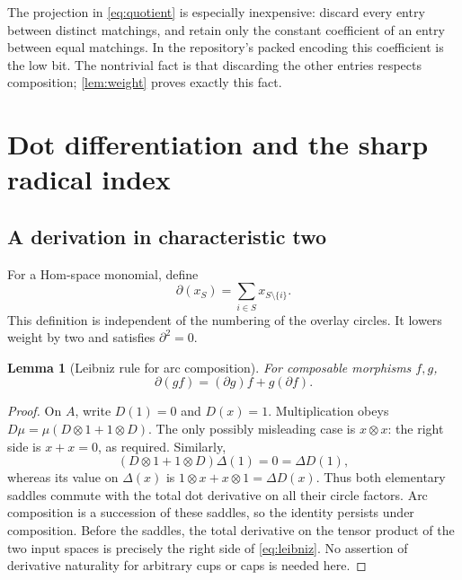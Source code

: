 \documentclass[11pt,letterpaper]{article}
\newtheorem{lemma}[theorem]{Lemma}
\theoremstyle{definition}
\theoremstyle{remark}
\begin{document}
The projection in \cref{eq:quotient} is especially inexpensive: discard every
entry between distinct matchings, and retain only the constant coefficient of
an entry between equal matchings. In the repository's packed encoding this
coefficient is the low bit. The nontrivial fact is that discarding the other
entries respects composition; \cref{lem:weight} proves exactly this fact.

\section{Dot differentiation and the sharp radical index}
\label{sec:sharp}
\subsection{A derivation in characteristic two}
For a Hom-space monomial, define
\begin{equation}\label{eq:derivative}
 \partial(x_S)=\sum_{i\in S}x_{S\setminus\{i\}}.
\end{equation}
This definition is independent of the numbering of the overlay circles.
It lowers weight by two and satisfies $\partial^2=0$.

\begin{lemma}[Leibniz rule for arc composition]\label{lem:derivation}
For composable morphisms $f,g$,
\begin{equation}\label{eq:leibniz}
 \partial(gf)=(\partial g)f+g(\partial f).
\end{equation}
\end{lemma}
\begin{proof}
On $A$, write $D(1)=0$ and $D(x)=1$. Multiplication obeys
$D\mu=\mu(D\otimes1+1\otimes D)$. The only possibly misleading case is
$x\otimes x$: the right side is $x+x=0$, as required. Similarly,
\[
 (D\otimes1+1\otimes D)\Delta(1)=0=\Delta D(1),
\]
whereas its value on $\Delta(x)$ is $1\otimes x+x\otimes1=\Delta D(x)$.
Thus both elementary saddles commute with the total dot derivative on all their
circle factors. Arc composition is a succession of these saddles, so the
identity persists under composition. Before the saddles, the total derivative
on the tensor product of the two input spaces is precisely the right side of
\cref{eq:leibniz}. No assertion of derivative naturality for arbitrary cups or
caps is needed here.
\end{proof}
\end{document}
